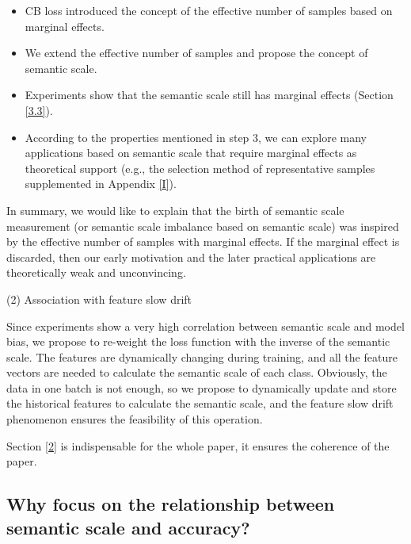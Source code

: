 \documentclass[10pt]{article} %
\begin{document}
\begin{itemize}
    \item CB loss introduced the concept of the effective number of samples based on marginal effects.
    \item We extend the effective number of samples and propose the concept of semantic scale.
    \item Experiments show that the semantic scale still has marginal effects (Section \ref{3.3}).
    \item According to the properties mentioned in step $3$, we can explore many applications based on semantic scale that require marginal effects as theoretical support (e.g., the selection method of representative samples supplemented in Appendix \ref{I}).
\end{itemize}

In summary, we would like to explain that the birth of semantic scale measurement (or semantic scale imbalance based on semantic scale) was inspired by the effective number of samples with marginal effects. If the marginal effect is discarded, then our early motivation and the later practical applications are theoretically weak and unconvincing.

(2) Association with feature slow drift

Since experiments show a very high correlation between semantic scale and model bias, we propose to re-weight the loss function with the inverse of the semantic scale. The features are dynamically changing during training, and all the feature vectors are needed to calculate the semantic scale of each class. Obviously, the data in one batch is not enough, so we propose to dynamically update and store the historical features to calculate the semantic scale, and the feature slow drift phenomenon ensures the feasibility of this operation.

Section \ref{2} is indispensable for the whole paper, it ensures the coherence of the paper.

\subsection{Why focus on the relationship between semantic scale and accuracy?}
\end{document}
